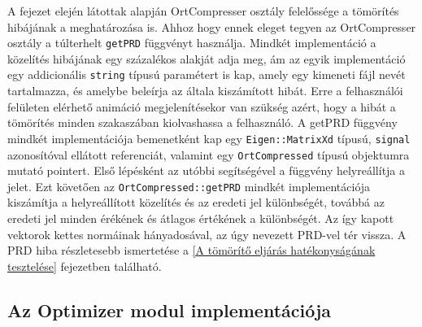 \documentclass[oneside,titlepage,12pt,a4paper]{report}
\begin{document}
\par A fejezet elején látottak alapján OrtCompresser osztály felelőssége a tömörítés hibájának a meghatározása is. Ahhoz hogy ennek eleget tegyen az OrtCompresser osztály a túlterhelt \texttt{getPRD} függvényt használja. Mindkét implementáció a közelítés hibájának egy százalékos alakját adja meg, ám az egyik implementáció egy addicionális \texttt{string} típusú paramétert is kap, amely egy kimeneti fájl nevét tartalmazza, és amelybe beleírja az általa kiszámított hibát. Erre a felhasználói felületen elérhető animáció megjelenítésekor van szükség azért, hogy a hibát a tömörítés minden szakaszában kiolvashassa a felhasználó. A getPRD függvény mindkét implementációja bemenetként kap egy \texttt{Eigen::MatrixXd} típusú, \texttt{signal} azonosítóval ellátott referenciát,  valamint egy \texttt{OrtCompressed} típusú objektumra mutató pointert. Első lépésként az utóbbi segítségével a függvény helyreállítja a jelet. Ezt követően az \texttt{OrtCompressed::getPRD} mindkét implementációja kiszámítja a helyreállított közelítés és az eredeti jel különbségét, továbbá az eredeti jel minden érékének és átlagos értékének a különbségét. Az így kapott vektorok kettes normáinak hányadosával, az úgy nevezett PRD-vel tér vissza. A PRD hiba részletesebb ismertetése a \ref{A tömörítő eljárás hatékonyságának tesztelése} fejezetben található.   

\subsection{Az Optimizer modul implementációja}
\end{document}
